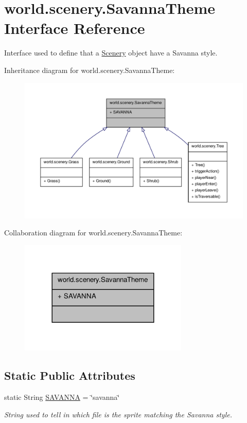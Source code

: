 \hypertarget{a00023}{\section{world.\-scenery.\-Savanna\-Theme Interface Reference}
\label{a00023}
}


Interface used to define that a \hyperlink{a00024}{Scenery} object have a Savanna style.  




Inheritance diagram for world.\-scenery.\-Savanna\-Theme\-:
\nopagebreak
\begin{figure}[H]
\begin{center}
\leavevmode
\includegraphics[width=350pt]{a00173}
\end{center}
\end{figure}


Collaboration diagram for world.\-scenery.\-Savanna\-Theme\-:
\nopagebreak
\begin{figure}[H]
\begin{center}
\leavevmode
\includegraphics[width=228pt]{a00174}
\end{center}
\end{figure}
\subsection*{Static Public Attributes}
\begin{DoxyCompactItemize}
\item 
static String \hyperlink{a00023_a69e8a9867db3a93074a41573940424b2}{S\-A\-V\-A\-N\-N\-A} = \char`\"{}savanna\char`\"{}
\begin{DoxyCompactList}\small\item\em String used to tell in which file is the sprite matching the Savanna style. \end{DoxyCompactList}\end{DoxyCompactItemize}


